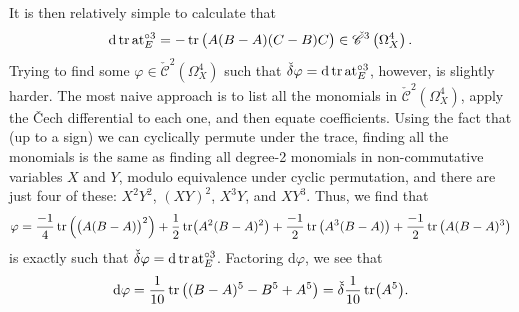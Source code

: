 \documentclass[11pt,fleqn]{article}
\theoremstyle{plain}
\theoremstyle{definition}
\theoremstyle{remark}
\numberwithin{equation}{theorem}
\newcommand{\cech}{\check{\mathscr{C}}}
\newcommand{\at}{\mathrm{at}}
\newcommand{\expat}[1]{\at^{\circ#1}}
\renewcommand{\d}{\mathrm{d}}
\begin{document}
        It is then relatively simple to calculate that
        \[
            \d\tr\expat{3}_E = -\tr\big(A(B-A)(C-B)C\big) \in \cech^3\left(\Omega^4_X\right).
        \]
        Trying to find some $\varphi\in\cech^2(\Omega^4_X)$ such that $\check\delta\varphi = \d\tr\expat{3}_E$, however, is slightly harder.
        The most naive approach is to list all the monomials in $\cech^2(\Omega^4_X)$, apply the Čech differential to each one, and then equate coefficients.
        Using the fact that (up to a sign) we can cyclically permute under the trace, finding all the monomials is the same as finding all degree-2 monomials in non-commutative variables $X$ and $Y$, modulo equivalence under cyclic permutation, and there are just four of these: $X^2Y^2$, $(XY)^2$, $X^3Y$, and $XY^3$.
        Thus, we find that
        \[
            \varphi
            =
            \frac{-1}{4}\tr\Big(\big(A(B-A)\big)^2\Big)
            + \frac12 \tr(A^2(B-A)^2)
            + \frac{-1}{2}\tr\big(A^3(B-A)\big)
            + \frac{-1}{2}\tr\big(A(B-A)^3\big)
        \]
        is exactly such that $\check\delta\varphi = \d\tr\expat{3}_E$.
        Factoring $\d\varphi$, we see that
        \[
            \d\varphi = \frac{1}{10}\tr\big((B-A)^5-B^5+A^5\big) = \check\delta\frac{1}{10}\tr(A^5).
        \]
\end{document}
